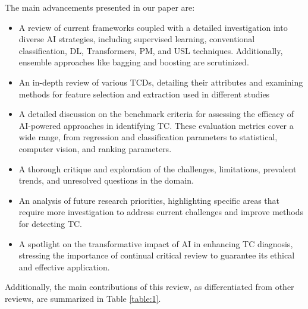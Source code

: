 \documentclass[a4paper,fleqn]{cas-sc}
\begin{document}
\noindent The main advancements presented in our paper are:
\begin{itemize}
\item A review of current frameworks coupled with a detailed investigation into diverse AI strategies, including supervised learning, conventional classification, \ac{DL}, Transformers, \ac{PM}, and \ac{USL} techniques. Additionally, ensemble approaches like bagging and boosting are scrutinized.

\item An in-depth review of various \acp{TCD}, detailing their attributes and examining methods for feature selection and extraction used in different studies

\item A detailed discussion on the benchmark criteria for assessing the efficacy of \ac{AI}-powered approaches in identifying TC. These evaluation metrics cover a wide range, from regression and classification parameters to statistical, computer vision, and ranking parameters.

\item A thorough critique and exploration of the challenges, limitations, prevalent trends, and unresolved questions in the domain.

\item An analysis of future research priorities, highlighting specific areas that require more investigation to address current challenges and improve methods for detecting TC.

\item A spotlight on the transformative impact of \ac{AI} in enhancing TC diagnosis, stressing the importance of continual critical review to guarantee its ethical and effective application.
\end{itemize}


\noindent Additionally, the main contributions of this review, as differentiated from other reviews, are summarized in Table \ref{table:1}.
\end{document}
